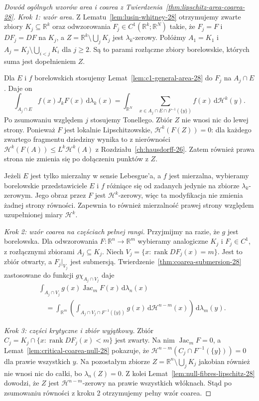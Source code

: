 \begin{proof}[Dowód ogólnych wzorów area i coarea z
Twierdzenia~\ref{thm:lipschitz-area-coarea-28}]
\emph{Krok 1: wzór area.}
Z Lematu~\ref{lem:lusin-whitney-28} otrzymujemy
zwarte zbiory $K_j\subseteq\mathbb R^k$ oraz
odwzorowania $F_j\in C^1(\mathbb R^k;\mathbb R^N)$
takie, że $F_j=F$ i $DF_j=DF$ na $K_j$, a
$Z=\mathbb R^k\setminus\bigcup_jK_j$ jest
$\lambda_k$-zerowy. Połóżmy
$A_1=K_1$ i
$A_j=K_j\setminus\bigcup_{i<j}K_i$ dla $j\ge2$.
Są to parami rozłączne zbiory borelowskie,
których suma jest dopełnieniem $Z$.

Dla $E$ i $f$ borelowskich stosujemy
Lemat~\ref{lem:c1-general-area-28} do
$F_j$ na $A_j\cap E$. Daje on
\[
 \int_{A_j\cap E}f(x)J_kF(x)\,\mathrm d\lambda_k(x)
 =\int_{\mathbb R^N}
 \sum_{x\in A_j\cap E\cap F^{-1}(\{y\})}f(x)
 \,\mathrm d\mathcal H^k(y).
\]
Po zsumowaniu względem $j$ stosujemy Tonellego.
Zbiór $Z$ nie wnosi nic do lewej strony.
Ponieważ $F$ jest lokalnie Lipschitzowskie,
$\mathcal H^k(F(Z))=0$: dla każdego zwartego
fragmentu dziedziny wynika to z nierówności
$\mathcal H^k(F(A))\le L^k\mathcal H^k(A)$
z Rozdziału~\ref{ch:hausdorff-26}.
Zatem również prawa strona nie zmienia się
po dołączeniu punktów z $Z$.

Jeżeli $E$ jest tylko mierzalny w sensie
Lebesgue'a, a $f$ jest mierzalna, wybieramy
borelowskie przedstawiciele $E$ i $f$ różniące
się od zadanych jedynie na zbiorze
$\lambda_k$-zerowym. Jego obraz przez $F$
jest $\mathcal H^k$-zerowy, więc ta modyfikacja
nie zmienia żadnej strony równości. Zapewnia
to również mierzalność prawej strony względem
uzupełnionej miary $\mathcal H^k$.

\emph{Krok 2: wzór coarea na częściach pełnej rangi.}
Przyjmijmy na razie, że $g$ jest borelowska.
Dla odwzorowania $F:\mathbb R^n\to\mathbb R^m$
wybieramy analogiczne $K_j$ i $F_j\in C^1$,
z rozłącznymi zbiorami $A_j\subseteq K_j$.
Niech
$V_j=\{x:\operatorname{rank}DF_j(x)=m\}$.
Jest to zbiór otwarty, a $F_j|_{V_j}$ jest
submersją. Twierdzenie~\ref{thm:coarea-submersion-28}
zastosowane do funkcji
$g\chi_{A_j\cap V_j}$ daje
\begin{align*}
 &\int_{A_j\cap V_j}g(x)\operatorname{Jac}_mF(x)
 \,\mathrm d\lambda_n(x)\\
 &\quad=\int_{\mathbb R^m}\left(
 \int_{A_j\cap V_j\cap F^{-1}(\{y\})}
 g(x)\,\mathrm d\mathcal H^{n-m}(x)\right)
 \,\mathrm d\lambda_m(y).
\end{align*}

\emph{Krok 3: części krytyczne i zbiór wyjątkowy.}
Zbiór
$C_j=K_j\cap\{x:\operatorname{rank}DF_j(x)<m\}$
jest zwarty. Na nim $\operatorname{Jac}_mF=0$,
a Lemat~\ref{lem:critical-coarea-null-28}
pokazuje, że
$\mathcal H^{n-m}(C_j\cap F^{-1}(\{y\}))=0$
dla prawie wszystkich $y$. Na pozostałym zbiorze
$Z=\mathbb R^n\setminus\bigcup_jK_j$ jakobian
również nie wnosi nic do całki, bo
$\lambda_n(Z)=0$. Z kolei
Lemat~\ref{lem:null-fibres-lipschitz-28} dowodzi,
że $Z$ jest $\mathcal H^{n-m}$-zerowy na
prawie wszystkich włóknach. Stąd po zsumowaniu
równości z kroku 2 otrzymujemy pełny wzór coarea.


\end{proof}
